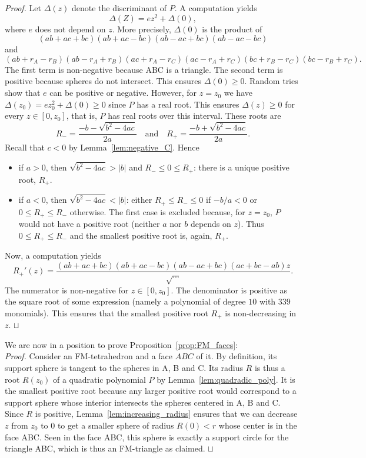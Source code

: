 \documentclass[11pt]{article}
\newenvironment{proof}{\noindent \emph{Proof. }}{\hfill \hbox{\rlap{$\sqcap$}$\sqcup$}\\}
\begin{document}
\begin{proof}
Let $\Delta(z)$ denote the discriminant of $P$.
A computation yields
\[
\Delta(Z)=ez^2+\Delta(0),
\]
where $e$ does not depend on $z$.
More precisely, $\Delta(0)$ is the product of
\[
(ab+ac+bc)(ab+ac-bc)(ab-ac+bc)(ab-ac-bc)
\]
and
\[
(ab+r_A-r_B)(ab-r_A+r_B)(ac+r_A-r_C)(ac-r_A+r_C)(bc+r_B-r_C)(bc-r_B+r_C).
\]
The first term is non-negative because ABC is a triangle.
The second term is positive because spheres do not intersect.
This ensures $\Delta(0)\geq 0$.
Random tries show that $e$ can be positive or negative.
However, for $z=z_0$ we have $\Delta(z_0)=ez_0^2+\Delta(0)\geq 0$ since $P$ has a real root.
This ensures $\Delta(z)\geq 0$ for every $z\in[0,z_0]$, that is, $P$ has real roots over this interval.
These roots are
\[
R_-=\frac{-b-\sqrt{b^2-4ac}}{2a}
\quad\textrm{and}\quad
R_+=\frac{-b+\sqrt{b^2-4ac}}{2a}.
\]
Recall that $c<0$ by Lemma~\ref{lem:negative_C}.
Hence
\begin{itemize}
\item if $a>0$, then $\sqrt{b^2-4ac}>|b|$ and $R_-\leq 0\leq R_+$: there is a unique positive root, $R_+$.
\item if $a<0$, then $\sqrt{b^2-4ac}<|b|$: either $R_+\leq R_-\leq 0$ if $-b/a<0$ or $0\leq R_+\leq R_-$ otherwise.
The first case is excluded because, for $z=z_0$, $P$ would not have a positive root (neither $a$ nor $b$ depends on $z$).
Thus $0\leq R_+\leq R_-$ and the smallest positive root is, again, $R_+$.
\end{itemize}
Now, a computation yields
\[
R_+'(z)=\frac{
(ab + ac + bc)(ab + ac - bc)(ab - ac + bc)(ac + bc -ab)z}{\sqrt{\cdots}}.
\]
The numerator is non-negative for $z\in[0,z_0]$.
The denominator is positive as the square root of some expression (namely a polynomial of degree $10$ with $339$ monomials).
This ensures that the smallest positive root $R_+$ is non-decreasing in $z$.
\end{proof}

\noindent We are now in a position to prove Proposition~\ref{prop:FM_faces}:\\

\begin{proof}
Consider an FM-tetrahedron and a face $ABC$ of it.
By definition, its support sphere is tangent to the spheres in A, B and C.
Its radius $R$ is thus a root $R(z_0)$ of a quadratic polynomial $P$ by Lemma~\ref{lem:quadradic_poly}.
It is the smallest positive root because any larger positive root would correspond to a support sphere whose interior intersects the spheres centered in A, B and C.
Since $R$ is positive, Lemma~\ref{lem:increasing_radius} ensures that we can decrease $z$ from $z_0$ to $0$ to get a smaller sphere of radius $R(0)<r$ whose center is in the face ABC.
Seen in the face ABC, this sphere is exactly a support circle for the triangle ABC, which is thus an FM-triangle as claimed.    
\end{proof}




\end{document}
